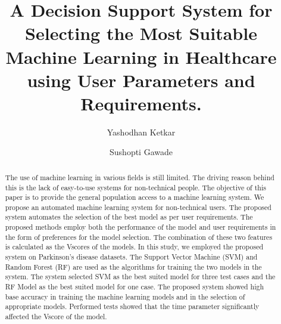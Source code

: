 \documentclass[a4paper,fleqn]{cas-dc}
\begin{document}
\let\WriteBookmarks\relax
\def\floatpagepagefraction{1}
\def\textpagefraction{.001}



\title [mode = title]{A Decision Support System for Selecting the Most Suitable Machine Learning in Healthcare using User Parameters and Requirements.}

\let\printorcid\relax

\author[1]{Yashodhan Ketkar}

\author[2]{Sushopti Gawade}

\begin{abstract}
    The use of machine learning in various fields is still limited. The driving reason behind this is the lack of easy-to-use systems for non-technical people. The objective of this paper is to provide the general population access to a machine learning system. We propose an automated machine learning system for non-technical users. The proposed system automates the selection of the best model as per user requirements. The proposed methods employ both the performance of the model and user requirements in the form of preferences for the model selection. The combination of these two features is calculated as the Vscores of the models. In this study, we employed the proposed system on Parkinson's disease datasets. The Support Vector Machine (SVM) and Random Forest (RF) are used as the algorithms for training the two models in the system. The system selected SVM as the best suited model for three test cases and the RF Model as the best suited model for one case. The proposed system showed high base accuracy in training the machine learning models and in the selection of appropriate models. Performed tests showed that the time parameter significantly affected the Vscore of the model.
\end{abstract}
\end{document}
